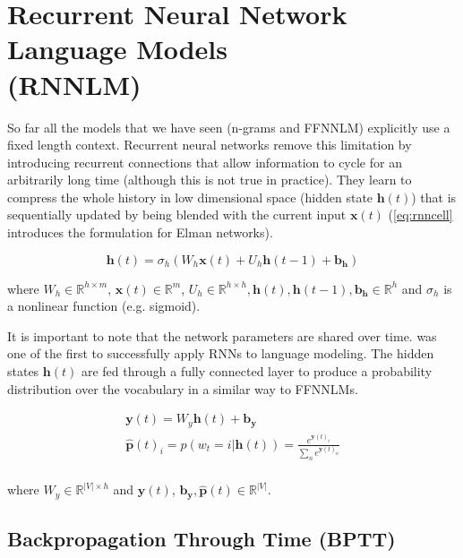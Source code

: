 \section{Recurrent Neural Network Language Models \\ (RNNLM)}
\label{sec:rnn}

So far all the models that we have seen (n-grams and FFNNLM) explicitly use a fixed length context. Recurrent neural networks remove this limitation by introducing recurrent connections that allow information to cycle for an arbitrarily long time (although this is not true in practice). They learn to compress the whole history in low dimensional space (hidden state $\mathbf{h}(t)$) that is sequentially updated by being blended with the current input $\mathbf{x}(t)$ (\autoref{eq:rnncell} introduces the formulation for Elman networks).

\begin{equation} \label{eq:rnncell}
		\mathbf{h}(t) = \sigma_h(W_h \mathbf{x}(t) + U_h \mathbf{h}(t-1) + \mathbf{b_h})
\end{equation}

where $W_h \in \mathbb{R}^{h \times m}$, $\mathbf{x}(t) \in \mathbb{R}^{m}$, $U_h \in \mathbb{R}^{h \times h} , \mathbf{h}(t), \mathbf{h}(t-1), \mathbf{b_h} \in \mathbb{R}^{h}$ and $\sigma_h$ is a nonlinear function (e.g. sigmoid). 

It is important to note that the network parameters are shared over time. \cite{mikolov2010recurrent} was one of the first to successfully apply RNNs to language modeling. The hidden states $\mathbf{h}(t)$ are fed through a fully connected layer to produce a probability distribution over the vocabulary in a similar way to FFNNLMs.

\begin{equation} \label{eq:rnnlm}
	\begin{gathered}
		\mathbf{y}(t) = W_y \mathbf{h}(t) + \mathbf{b_y} \\
		\mathbf{\hat{p}}(t)_i=\hat{p}(w_t=i|\mathbf{h}(t)) = \frac{e^{\mathbf{y}(t)_i}}{\sum_{n}e^{\mathbf{y}(t)_n}} \\
	\end{gathered}
\end{equation}

where $W_y \in \mathbb{R}^{|V| \times h}$ and $\mathbf{y}(t)$, $\mathbf{b_y}, \mathbf{\hat{p}}(t) \in \mathbb{R}^{|V|}$.

\subsection{Backpropagation Through Time (BPTT)}

